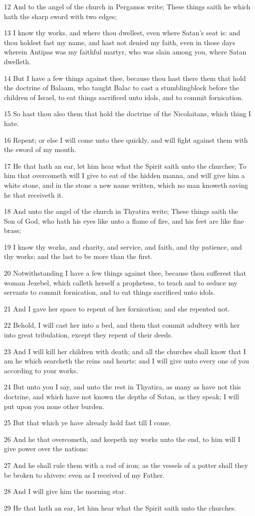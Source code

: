 \documentclass[11pt,a4paper,twocolumn,twoside]{book}
\begin{document}
12 And to the angel of the church in Pergamos write; These things saith he which hath the sharp sword with two edges;

13 I know thy works, and where thou dwellest, even where Satan's seat is: and thou holdest fast my name, and hast not denied my faith, even in those days wherein Antipas was my faithful martyr, who was slain among you, where Satan dwelleth.

14 But I have a few things against thee, because thou hast there them that hold the doctrine of Balaam, who taught Balac to cast a stumblingblock before the children of Israel, to eat things sacrificed unto idols, and to commit fornication.

15 So hast thou also them that hold the doctrine of the Nicolaitans, which thing I hate.

16 Repent; or else I will come unto thee quickly, and will fight against them with the sword of my mouth.

17 He that hath an ear, let him hear what the Spirit saith unto the churches; To him that overcometh will I give to eat of the hidden manna, and will give him a white stone, and in the stone a new name written, which no man knoweth saving he that receiveth it.

18 And unto the angel of the church in Thyatira write; These things saith the Son of God, who hath his eyes like unto a flame of fire, and his feet are like fine brass;

19 I know thy works, and charity, and service, and faith, and thy patience, and thy works; and the last to be more than the first.

20 Notwithstanding I have a few things against thee, because thou sufferest that woman Jezebel, which calleth herself a prophetess, to teach and to seduce my servants to commit fornication, and to eat things sacrificed unto idols.

21 And I gave her space to repent of her fornication; and she repented not.

22 Behold, I will cast her into a bed, and them that commit adultery with her into great tribulation, except they repent of their deeds.

23 And I will kill her children with death; and all the churches shall know that I am he which searcheth the reins and hearts: and I will give unto every one of you according to your works.

24 But unto you I say, and unto the rest in Thyatira, as many as have not this doctrine, and which have not known the depths of Satan, as they speak; I will put upon you none other burden.

25 But that which ye have already hold fast till I come.

26 And he that overcometh, and keepeth my works unto the end, to him will I give power over the nations:

27 And he shall rule them with a rod of iron; as the vessels of a potter shall they be broken to shivers: even as I received of my Father.

28 And I will give him the morning star.

29 He that hath an ear, let him hear what the Spirit saith unto the churches.
\appendix
\backmatter
\end{document}
